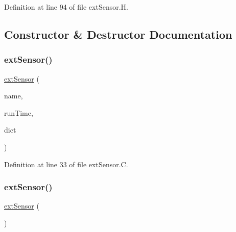 Definition at line 94 of file ext\+Sensor.\+H.



\subsection{Constructor \& Destructor Documentation}
\mbox{\label{classFoam_1_1externalIOObject_1_1extSensor_aa89bb9d0a3974d9fe7c89817d37b3a95}} 
\subsubsection{\texorpdfstring{ext\+Sensor()}{extSensor()}\hspace{0.1cm}{\footnotesize\ttfamily [1/2]}}
{\footnotesize\ttfamily \hyperlink{classFoam_1_1externalIOObject_1_1extSensor}{ext\+Sensor} (\begin{DoxyParamCaption}\item[{const word \&}]{name,  }\item[{const Time \&}]{run\+Time,  }\item[{const dictionary \&}]{dict }\end{DoxyParamCaption})}



Definition at line 33 of file ext\+Sensor.\+C.

\mbox{\label{classFoam_1_1externalIOObject_1_1extSensor_a31df8113709cabbf0b5e4da941ba28c7}} 
\subsubsection{\texorpdfstring{ext\+Sensor()}{extSensor()}\hspace{0.1cm}{\footnotesize\ttfamily [2/2]}}
{\footnotesize\ttfamily \hyperlink{classFoam_1_1externalIOObject_1_1extSensor}{ext\+Sensor} (\begin{DoxyParamCaption}\item[{const \hyperlink{classFoam_1_1externalIOObject_1_1extSensor}{ext\+Sensor} \&}]{ }\end{DoxyParamCaption})\hspace{0.3cm}{\ttfamily [delete]}}

